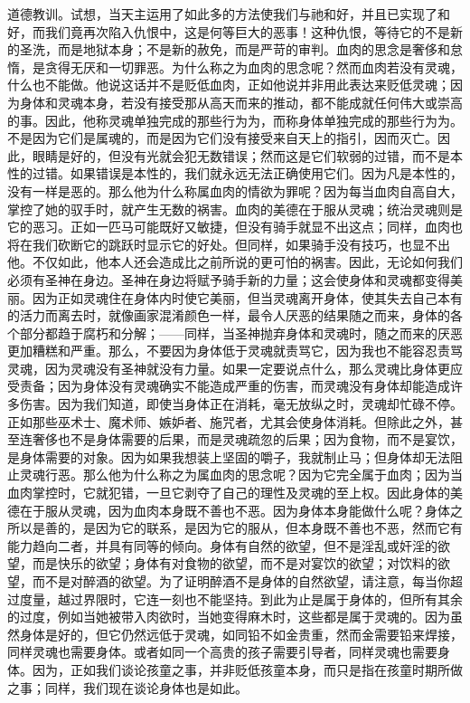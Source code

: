 道德教训。试想，当天主运用了如此多的方法使我们与祂和好，并且已实现了和好，而我们竟再次陷入仇恨中，这是何等巨大的恶事！这种仇恨，等待它的不是新的圣洗，而是地狱本身；不是新的赦免，而是严苛的审判。血肉的思念是奢侈和怠惰，是贪得无厌和一切罪恶。为什么称之为血肉的思念呢？然而血肉若没有灵魂，什么也不能做。他说这话并不是贬低血肉，正如他说并非用此表达来贬低灵魂；因为身体和灵魂本身，若没有接受那从高天而来的推动，都不能成就任何伟大或崇高的事。因此，他称灵魂单独完成的那些行为为，而称身体单独完成的那些行为为。不是因为它们是属魂的，而是因为它们没有接受来自天上的指引，因而灭亡。因此，眼睛是好的，但没有光就会犯无数错误；然而这是它们软弱的过错，而不是本性的过错。如果错误是本性的，我们就永远无法正确使用它们。因为凡是本性的，没有一样是恶的。那么他为什么称属血肉的情欲为罪呢？因为每当血肉自高自大，掌控了她的驭手时，就产生无数的祸害。血肉的美德在于服从灵魂；统治灵魂则是它的恶习。正如一匹马可能既好又敏捷，但没有骑手就显不出这点；同样，血肉也将在我们砍断它的跳跃时显示它的好处。但同样，如果骑手没有技巧，也显不出他。不仅如此，他本人还会造成比之前所说的更可怕的祸害。因此，无论如何我们必须有圣神在身边。圣神在身边将赋予骑手新的力量；这会使身体和灵魂都变得美丽。因为正如灵魂住在身体内时使它美丽，但当灵魂离开身体，使其失去自己本有的活力而离去时，就像画家混淆颜色一样，最令人厌恶的结果随之而来，身体的各个部分都趋于腐朽和分解；——同样，当圣神抛弃身体和灵魂时，随之而来的厌恶更加糟糕和严重。那么，不要因为身体低于灵魂就责骂它，因为我也不能容忍责骂灵魂，因为灵魂没有圣神就没有力量。如果一定要说点什么，那么灵魂比身体更应受责备；因为身体没有灵魂确实不能造成严重的伤害，而灵魂没有身体却能造成许多伤害。因为我们知道，即使当身体正在消耗，毫无放纵之时，灵魂却忙碌不停。正如那些巫术士、魔术师、嫉妒者、施咒者，尤其会使身体消耗。但除此之外，甚至连奢侈也不是身体需要的后果，而是灵魂疏忽的后果；因为食物，而不是宴饮，是身体需要的对象。因为如果我想装上坚固的嚼子，我就制止马；但身体却无法阻止灵魂行恶。那么他为什么称之为属血肉的思念呢？因为它完全属于血肉；因为当血肉掌控时，它就犯错，一旦它剥夺了自己的理性及灵魂的至上权。因此身体的美德在于服从灵魂，因为血肉本身既不善也不恶。因为身体本身能做什么呢？身体之所以是善的，是因为它的联系，是因为它的服从，但本身既不善也不恶，然而它有能力趋向二者，并具有同等的倾向。身体有自然的欲望，但不是淫乱或奸淫的欲望，而是快乐的欲望；身体有对食物的欲望，而不是对宴饮的欲望；对饮料的欲望，而不是对醉酒的欲望。为了证明醉酒不是身体的自然欲望，请注意，每当你超过度量，越过界限时，它连一刻也不能坚持。到此为止是属于身体的，但所有其余的过度，例如当她被带入肉欲时，当她变得麻木时，这些都是属于灵魂的。因为虽然身体是好的，但它仍然远低于灵魂，如同铅不如金贵重，然而金需要铅来焊接，同样灵魂也需要身体。或者如同一个高贵的孩子需要引导者，同样灵魂也需要身体。因为，正如我们谈论孩童之事，并非贬低孩童本身，而只是指在孩童时期所做之事；同样，我们现在谈论身体也是如此。\par

